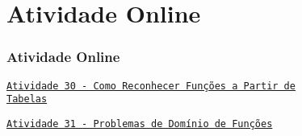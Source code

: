 \section{Atividade Online}
\begin{frame}
\frametitle{Atividade Online} 

\href{https://pt.khanacademy.org/math/algebra-home/alg-functions/alg-recognizing-functions-ddp/e/recognizing_functions}
{{\tt Atividade 30 - Como Reconhecer Funções a Partir de\\ Tabelas}}

\href{https://pt.khanacademy.org/math/algebra/x2f8bb11595b61c86:functions/x2f8bb11595b61c86:determining-the-domain-of-a-function/e/interpreting-domain}
{{\tt Atividade 31 - Problemas de Domínio de Funções}}


\end{frame}
